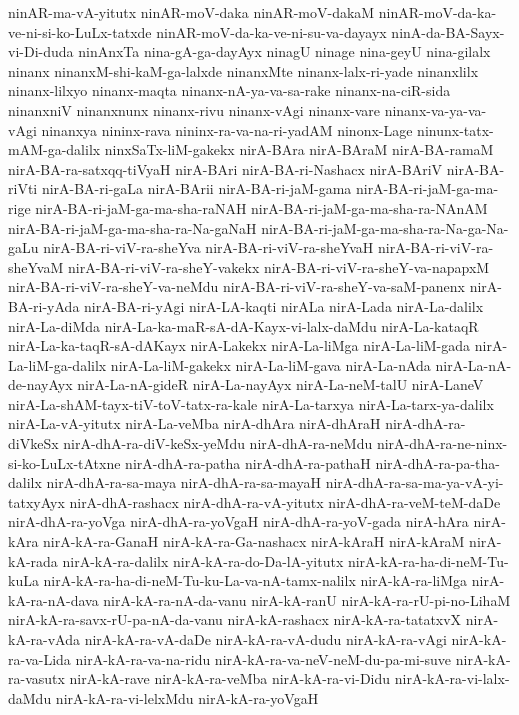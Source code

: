 {ninAR-ma-vA-yitutx
ninAR-moV-daka
ninAR-moV-dakaM
ninAR-moV-da-ka-ve-ni-si-ko-LuLx-tatxde
ninAR-moV-da-ka-ve-ni-su-va-dayayx
ninA-da-BA-Sayx-vi-Di-duda
ninAnxTa
nina-gA-ga-dayAyx
ninagU
ninage
nina-geyU
nina-gilalx
ninanx
ninanxM-shi-kaM-ga-lalxde
ninanxMte
ninanx-lalx-ri-yade
ninanxlilx
ninanx-lilxyo
ninanx-maqta
ninanx-nA-ya-va-sa-rake
ninanx-na-ciR-sida
ninanxniV
ninanxnunx
ninanx-rivu
ninanx-vAgi
ninanx-vare
ninanx-va-ya-va-vAgi
ninanxya
nininx-rava
nininx-ra-va-na-ri-yadAM
ninonx-Lage
ninunx-tatx-mAM-ga-dalilx
ninxSaTx-liM-gakekx
nirA-BAra
nirA-BAraM
nirA-BA-ramaM
nirA-BA-ra-satxqq-tiVyaH
nirA-BAri
nirA-BA-ri-Nashacx
nirA-BAriV
nirA-BA-riVti
nirA-BA-ri-gaLa
nirA-BArii
nirA-BA-ri-jaM-gama
nirA-BA-ri-jaM-ga-ma-rige
nirA-BA-ri-jaM-ga-ma-sha-raNAH
nirA-BA-ri-jaM-ga-ma-sha-ra-NAnAM
nirA-BA-ri-jaM-ga-ma-sha-ra-Na-gaNaH
nirA-BA-ri-jaM-ga-ma-sha-ra-Na-ga-Na-gaLu
nirA-BA-ri-viV-ra-sheYva
nirA-BA-ri-viV-ra-sheYvaH
nirA-BA-ri-viV-ra-sheYvaM
nirA-BA-ri-viV-ra-sheY-vakekx
nirA-BA-ri-viV-ra-sheY-va-napapxM
nirA-BA-ri-viV-ra-sheY-va-neMdu
nirA-BA-ri-viV-ra-sheY-va-saM-panenx
nirA-BA-ri-yAda
nirA-BA-ri-yAgi
nirA-LA-kaqti
nirALa
nirA-Lada
nirA-La-dalilx
nirA-La-diMda
nirA-La-ka-maR-sA-dA-Kayx-vi-lalx-daMdu
nirA-La-kataqR
nirA-La-ka-taqR-sA-dAKayx
nirA-Lakekx
nirA-La-liMga
nirA-La-liM-gada
nirA-La-liM-ga-dalilx
nirA-La-liM-gakekx
nirA-La-liM-gava
nirA-La-nAda
nirA-La-nA-de-nayAyx
nirA-La-nA-gideR
nirA-La-nayAyx
nirA-La-neM-talU
nirA-LaneV
nirA-La-shAM-tayx-tiV-toV-tatx-ra-kale
nirA-La-tarxya
nirA-La-tarx-ya-dalilx
nirA-La-vA-yitutx
nirA-La-veMba
nirA-dhAra
nirA-dhAraH
nirA-dhA-ra-diVkeSx
nirA-dhA-ra-diV-keSx-yeMdu
nirA-dhA-ra-neMdu
nirA-dhA-ra-ne-ninx-si-ko-LuLx-tAtxne
nirA-dhA-ra-patha
nirA-dhA-ra-pathaH
nirA-dhA-ra-pa-tha-dalilx
nirA-dhA-ra-sa-maya
nirA-dhA-ra-sa-mayaH
nirA-dhA-ra-sa-ma-ya-vA-yi-tatxyAyx
nirA-dhA-rashacx
nirA-dhA-ra-vA-yitutx
nirA-dhA-ra-veM-teM-daDe
nirA-dhA-ra-yoVga
nirA-dhA-ra-yoVgaH
nirA-dhA-ra-yoV-gada
nirA-hAra
nirA-kAra
nirA-kA-ra-GanaH
nirA-kA-ra-Ga-nashacx
nirA-kAraH
nirA-kAraM
nirA-kA-rada
nirA-kA-ra-dalilx
nirA-kA-ra-do-Da-lA-yitutx
nirA-kA-ra-ha-di-neM-Tu-kuLa
nirA-kA-ra-ha-di-neM-Tu-ku-La-va-nA-tamx-nalilx
nirA-kA-ra-liMga
nirA-kA-ra-nA-dava
nirA-kA-ra-nA-da-vanu
nirA-kA-ranU
nirA-kA-ra-rU-pi-no-LihaM
nirA-kA-ra-savx-rU-pa-nA-da-vanu
nirA-kA-rashacx
nirA-kA-ra-tatatxvX
nirA-kA-ra-vAda
nirA-kA-ra-vA-daDe
nirA-kA-ra-vA-dudu
nirA-kA-ra-vAgi
nirA-kA-ra-va-Lida
nirA-kA-ra-va-na-ridu
nirA-kA-ra-va-neV-neM-du-pa-mi-suve
nirA-kA-ra-vasutx
nirA-kA-rave
nirA-kA-ra-veMba
nirA-kA-ra-vi-Didu
nirA-kA-ra-vi-lalx-daMdu
nirA-kA-ra-vi-lelxMdu
nirA-kA-ra-yoVgaH
}
